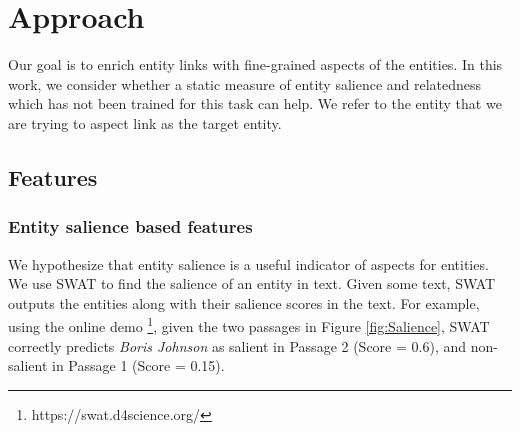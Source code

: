 \section{Approach}
\label{sec:Approach}
Our goal is to enrich entity links with fine-grained aspects of the entities. In this work, we consider whether a static measure of entity salience and relatedness which has not been trained for this task can help. We refer to the entity that we are trying to aspect link as the target entity.


\subsection{Features}
\label{subsec:Features}

\subsubsection{Entity salience based features}
\label{subsubsec:Entity salience based features}

We hypothesize that entity salience is a useful indicator of aspects for entities. We use SWAT \cite{swat}  to find the salience of an entity in text. Given some text, SWAT outputs the entities along with their salience scores in the text. For example, using the online demo \footnote{https://swat.d4science.org/}, given the two passages in Figure \ref{fig:Salience}, SWAT correctly predicts \textit{Boris Johnson} as salient in Passage 2 (Score = 0.6), and non-salient in Passage 1 (Score = 0.15). 

